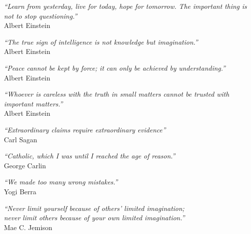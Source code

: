 
\begin{epigrafe}

\vspace*{\fill}\lang
{
    \begin{flushright}
        \textit{``Learn from yesterday, live for today, hope for tomorrow. The important thing is not to stop questioning.''} \\ Albert Einstein
    \end{flushright}
    \begin{flushright}
        \textit{``The true sign of intelligence is not knowledge but imagination.''} \\  Albert Einstein
    \end{flushright}
    \begin{flushright}
        \textit{``Peace cannot be kept by force; it can only be achieved by understanding.''} \\ Albert Einstein
    \end{flushright}
    \begin{flushright}
        \textit{``Whoever is careless with the truth in small matters cannot be trusted with important matters.''} \\ Albert Einstein
    \end{flushright}
    \begin{flushright}
        \textit{``Extraordinary claims require extraordinary evidence''} \\ Carl Sagan
    \end{flushright}
    \begin{flushright}
        \textit{``Catholic, which I was until I reached the age of reason.''} \\ George Carlin
    \end{flushright}
    \begin{flushright}
        \textit{``We made too many wrong mistakes.''} \\ Yogi Berra
    \end{flushright}
}
{
    \begin{flushright}
        \textit{``Never limit yourself because of others’ limited imagination;\\
                  never limit others because of your own limited imagination.''} \\ Mae C. Jemison
    \end{flushright}
}

\end{epigrafe}


